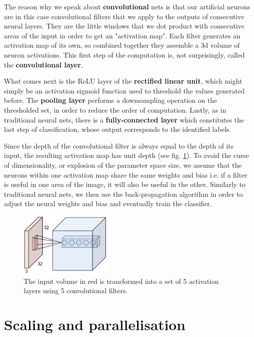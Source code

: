 \documentclass[a4paper, 11pt]{article}
\numberwithin{equation}{section}
\begin{document}
		The reason why we speak about \textbf{convolutional} nets \cite{stanford2016convnets} is that our artificial neurons are in this case convolutional filters that we apply to the outputs of consecutive neural layers. They are the little windows that we dot product with consecutive areas of the input in order to get an "activation map". Each filter generates an activation map of its own, so combined together they assemble a 3d volume of neuron activations. This first step of the computation is, not surprisingly, called the \textbf{convolutional layer}.
		
		What comes next is the ReLU layer of the \textbf{rectified linear unit}, which might simply be an activation sigmoid function used to threshold the values generated before. 
		The \textbf{pooling layer} performs a downsampling operation on the thresholded set, in order to reduce the order of computation.
		Lastly, as in traditional neural nets, there is  a \textbf{fully-connected layer} which constitutes the last step of classification, whose output corresponds to the identified labels.
		
		Since the depth of the convolutional filter is always equal to the depth of its input, the resulting activation map has unit depth (see fig. \ref{fig:conv_net}). To avoid the curse of dimensionality, or explosion of the parameter space size, we assume that the neurons within one activation map share the same weights and bias i.e. if a filter is useful in one area of the image, it will also be useful in the other. Similarly to traditional neural nets, we then use the back-propagation algorithm in order to adjust the neural weights and bias and eventually train the classifier.
		
		\begin{figure}[!h]
			\centering
			\includegraphics[page=1,width=0.40\textwidth]{depthcol.jpeg}
			\caption{\label{fig:conv_net}{The input volume in red is transformed into a set of 5 activation layers using 5 convolutional filters.}}
		\end{figure} 
		
		\section{Scaling and parallelisation}
		
\end{document}
